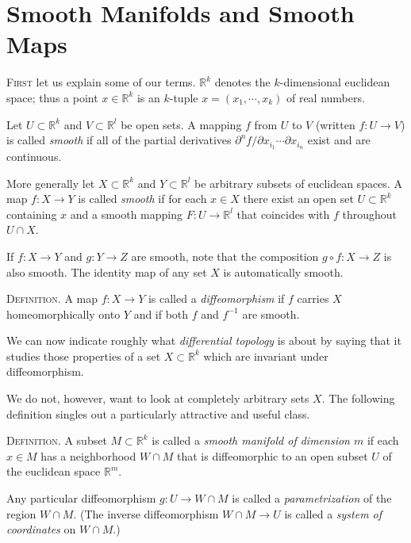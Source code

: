 
\section{Smooth Manifolds and Smooth Maps}

\textsc{First} let us explain some of our terms. $\mathbb{R}^{k}$ denotes the $k$-dimensional euclidean space; thus a point $x \in \mathbb{R}^{k}$ is an $k$-tuple $x = (x_1, \cdots, x_k)$ of real numbers.

Let $U \subset \mathbb{R}^{k}$ and $V \subset \mathbb{R}^{l}$ be open sets. A mapping $f$ from $U$ to $V$ (written $f : U \to V$) is called \textit{smooth} if all of the partial derivatives $\partial^n f / \partial x_{i_1} \cdots \partial x_{i_n}$ exist and are continuous.

More generally let $X \subset \mathbb{R}^{k}$ and $Y \subset \mathbb{R}^{l}$ be arbitrary subsets of euclidean spaces. A map $f : X \to Y$ is called \textit{smooth} if for each $x \in X$ there exist an open set $U \subset \mathbb{R}^{k}$ containing $x$ and a smooth mapping $F : U \to \mathbb{R}^{l}$ that coincides with $f$ throughout $U \cap X$.

If $f : X \to Y$ and $g : Y \to Z$ are smooth, note that the composition $g \circ f : X \to Z$ is also smooth. The identity map of any set $X$ is automatically smooth.

\textsc{Definition.} A map $f : X \to Y$ is called a \textit{diffeomorphism} if $f$ carries $X$ homeomorphically onto $Y$ and if both $f$ and $f^{-1}$ are smooth.

We can now indicate roughly what \textit{differential topology} is about by saying that it studies those properties of a set $X \subset \mathbb{R}^{k}$ which are invariant under diffeomorphism.

We do not, however, want to look at completely arbitrary sets $X$. The following definition singles out a particularly attractive and useful class.

\textsc{Definition.} A subset $M \subset \mathbb{R}^{k}$ is called a \textit{smooth manifold of dimension $m$} if each $x \in M$ has a neighborhood $W \cap M$ that is diffeomorphic to an open subset $U$ of the euclidean space $\mathbb{R}^{m}$.

Any particular diffeomorphism $g : U \to W \cap M$ is called a \textit{parametrization} of the region $W \cap M$. (The inverse diffeomorphism $W \cap M \to U$ is called a \textit{system of coordinates} on $W \cap M$.)


